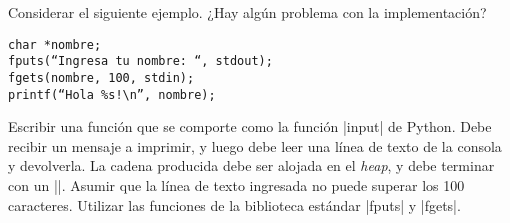 \begin{ejercicio}
Considerar el siguiente ejemplo. ¿Hay algún problema con la implementación?

\begin{lstlisting}[numbers=none]
char *nombre;
fputs(“Ingresa tu nombre: “, stdout);
fgets(nombre, 100, stdin);
printf(“Hola %s!\n”, nombre);
\end{lstlisting}
\end{ejercicio}

\begin{ejercicio}
Escribir una función que se comporte como la función |input| de Python. Debe
recibir un mensaje a imprimir, y luego debe leer una línea de texto de la
consola y devolverla. La cadena producida debe ser alojada en el \emph{heap},
y debe terminar con un |\0|. Asumir que la línea de texto ingresada
no puede superar los 100 caracteres. Utilizar las funciones de la
biblioteca estándar |fputs| y |fgets|.
\end{ejercicio}
